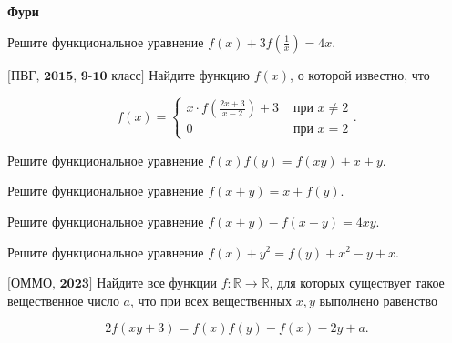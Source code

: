 \centerline{\bf \Huge Фури}


Решите функциональное уравнение $f(x)+3 f\left(\frac{1}{x}\right)=4 x$.


$\bigl[\textbf{ПВГ, 2015, 9-10 класс}\bigr]$
Найдите функцию $f(x)$, о которой известно, что

$$
f(x)=\left\{\begin{array}{ll}
x \cdot f\left(\frac{2 x+3}{x-2}\right)+3 & \text { при } x \neq 2 \\
0 & \text { при } x=2
\end{array} .\right.
$$


Решите функциональное уравнение $f(x) f(y)=f(x y)+x+y$.


Решите функциональное уравнение $f(x+y)=x+f(y)$.


Решите функциональное уравнение $f(x+y)-f(x-y)=4 x y$.


Решите функциональное уравнение $f(x)+y^2=f(y)+x^2-y+x$.


$\bigl[\textbf{ОММО, 2023}\bigr]$
Найдите все функции $f: \mathbb{R} \rightarrow \mathbb{R}$, для которых существует такое вещественное число $a$, что при всех вещественных $x, y$ выполнено равенство

$$
2 f(x y+3)=f(x) f(y)-f(x)-2 y+a .
$$

